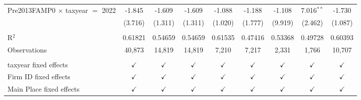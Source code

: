 {\begin{tabular}{lcccccccc}
   Pre2013FAMP0 $\times$ taxyear $=$ 2022  & -1.845        & -1.609        & -1.609        & -1.088        & -1.188         & -1.108        & 7.016$^{**}$  & -1.730\\   
                                           & (3.716)       & (1.311)       & (1.311)       & (1.020)       & (1.777)        & (9.919)       & (2.462)       & (1.087)\\   
    \\
   R$^2$                                   & 0.61821       & 0.54659       & 0.54659       & 0.61535       & 0.47416        & 0.53368       & 0.49728       & 0.60393\\  
   Observations                            & 40,873        & 14,819        & 14,819        & 7,210         & 7,217          & 2,331         & 1,766         & 10,707\\  
    \\
   taxyear fixed effects                   & $\checkmark$  & $\checkmark$  & $\checkmark$  & $\checkmark$  & $\checkmark$   & $\checkmark$  & $\checkmark$  & $\checkmark$\\   
   Firm ID fixed effects                   & $\checkmark$  & $\checkmark$  & $\checkmark$  & $\checkmark$  & $\checkmark$   & $\checkmark$  & $\checkmark$  & $\checkmark$\\   
   Main Place fixed effects                & $\checkmark$  & $\checkmark$  & $\checkmark$  & $\checkmark$  & $\checkmark$   & $\checkmark$  & $\checkmark$  & $\checkmark$\\   
   \bottomrule
\end{tabular}
}
